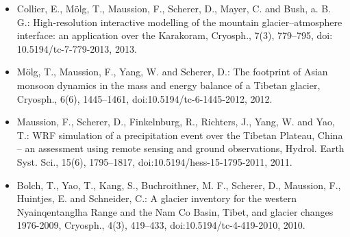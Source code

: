 \begin{footnotesize}
\begin{itemize}[nosep]
\item {} 
Collier, E., Mölg, T., Maussion, F., Scherer, D., Mayer, C. and Bush, a. B. G.: High-resolution interactive modelling
of the mountain glacier--atmosphere interface: an application over the Karakoram, Cryosph., 7(3), 779--795, doi:
10.5194/tc-7-779-2013, 2013.

\item {} 
Mölg, T., Maussion, F., Yang, W. and Scherer, D.: The footprint of Asian monsoon dynamics in the mass and energy
balance of a Tibetan glacier, Cryosph., 6(6), 1445--1461, doi:10.5194/tc-6-1445-2012, 2012.

\item {} 
Maussion, F., Scherer, D., Finkelnburg, R., Richters, J., Yang, W. and Yao, T.: WRF simulation of a precipitation
event over the Tibetan Plateau, China -- an assessment using remote sensing and ground observations, Hydrol. Earth
Syst. Sci., 15(6), 1795--1817, doi:10.5194/hess-15-1795-2011, 2011.

\item {} 
Bolch, T., Yao, T., Kang, S., Buchroithner, M. F., Scherer, D., Maussion, F., Huintjes, E. and Schneider, C.: A
glacier inventory for the western Nyainqentanglha Range and the Nam Co Basin, Tibet, and glacier changes 1976-2009,
Cryosph., 4(3), 419--433, doi:10.5194/tc-4-419-2010, 2010.


\end{itemize}
\end{footnotesize}